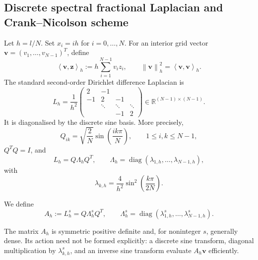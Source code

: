 \documentclass[reqno]{amsart}
\newcommand{\Ah}{A_h}
\newcommand{\ip}[2]{\left\langle #1,#2\right\rangle_h}
\newcommand{\normh}[1]{\left\|#1\right\|_h}
\begin{document}
\subsection{Discrete spectral fractional Laplacian and Crank--Nicolson scheme}
Let $h=l/N$. Set $x_i=ih$ for $i=0,\ldots,N$. For an interior grid vector
$\mathbf v=(v_1,\ldots,v_{N-1})^T$, define
\begin{equation}\label{eq:disc-ip}
 \ip{\mathbf v}{\mathbf z}:=h\sum_{i=1}^{N-1}v_i z_i,
 \qquad \normh{\mathbf v}^2=\ip{\mathbf v}{\mathbf v}.
\end{equation}
The standard second-order Dirichlet difference Laplacian is
\begin{equation}\label{eq:Lh}
 L_h=\frac1{h^2}
 \begin{pmatrix}
 2&-1&&\\
 -1&2&-1&\\
 &\ddots&\ddots&\ddots\\
 &&-1&2
 \end{pmatrix}\in\mathbb R^{(N-1)\times(N-1)}.
\end{equation}
It is diagonalised by the discrete sine basis. More precisely,
\begin{equation}\label{eq:Q}
 Q_{ik}=\sqrt{\frac2N}\sin\!\left(\frac{ik\pi}{N}\right),
 \qquad 1\le i,k\le N-1,
\end{equation}
$Q^TQ=I$, and
\begin{equation}\label{eq:eig-Lh}
 L_h=Q\Lambda_hQ^T,
 \qquad
 \Lambda_h=\operatorname{diag}(\lambda_{1,h},\ldots,\lambda_{N-1,h}),
\end{equation}
with
\begin{equation}\label{eq:lambda-h}
 \lambda_{k,h}=\frac4{h^2}\sin^2\!\left(\frac{k\pi}{2N}\right).
\end{equation}

\begin{definition}\label{def:Ah}
We define
\begin{equation}\label{eq:Ah}
 \Ah:=L_h^s=Q\Lambda_h^sQ^T,
 \qquad
 \Lambda_h^s=\operatorname{diag}(\lambda_{1,h}^s,\ldots,\lambda_{N-1,h}^s).
\end{equation}
\end{definition}
The matrix $\Ah$ is symmetric positive definite and, for noninteger $s$, generally dense. Its action need not be formed explicitly: a discrete sine transform, diagonal multiplication by $\lambda_{k,h}^s$, and an inverse sine transform evaluate $\Ah\mathbf v$ efficiently.
\end{document}
